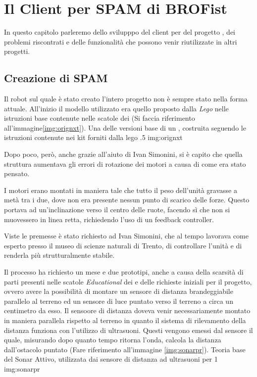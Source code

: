 \chapter{Il Client per SPAM di BROFist}
\label{chap:SPAMC}

In questo capitolo parleremo dello svilupppo del client per \SPAM{} del
progetto \BROFist{}, dei problemi riscontrati e delle funzionalità che
possono venir riutilizzate in altri progetti.

\section{Creazione di SPAM}
Il robot sul quale è stato creato l'intero progetto non è sempre stato
nella forma attuale. All'inizio il modello utilizzato era quello proposto
dalla \emph{Lego} nelle istruzioni base contenute nelle scatole dei
\nxt{} (Si faccia riferimento all'immagine\ref{img:orignxt}).
        {Una delle versioni base di un \nxt{}, costruita seguendo le
        istruzioni contenute nei kit forniti dalla lego}
        {.5}
        {img:orignxt}

Dopo poco, però, anche grazie all'aiuto di Ivan Simonini, si è capito che
quella struttura aumentava gli errori di rotazione dei motori a causa di come era
stato pensato.

I motori erano montati in maniera tale che tutto il peso dell'unità
gravasse a metà tra i due, dove non era presente nessun punto di scarico
delle forze. Questo portava ad un'inclinazione verso il centro delle ruote,
facendo sì che non si muovessero in linea retta, richiedendo l'uso di un
feedback controller.

Viste le premesse è stato richiesto ad Ivan Simonini, che al tempo lavorava
come esperto presso il museo di scienze naturali di Trento, di controllare
l'unità e di renderla più strutturalmente stabile.

Il processo ha richiesto un mese e due prototipi, anche a causa della
scarsità di parti presenti nelle scatole \emph{Educational} dei \nxt{} e
delle richieste iniziali per il progetto, ovvero avere la possibilità di
montare un sensore di distanza brandeggiabile parallelo al terreno ed un
sensore di luce puntato verso il terreno a circa un centimetro da esso.
Il sensoore di distanza doveva venir necessariamente montato in maniera
parallela rispetto al terreno in quanto il sistema di rilevamento della
distanza funziona con l'utilizzo di ultrasuoni. Questi vengono emessi dal
sensore il quale, misurando dopo quanto tempo ritorna l'onda, calcola la
distanza dall'ostacolo puntato (Fare riferimento all'immagine
\ref{img:sonarpr}).
        {Teoria base del Sonar Attivo, utilizzata dai sensore di distanza
        ad ultrasuoni per \nxt{}}
        {1}
        {img:sonarpr}

